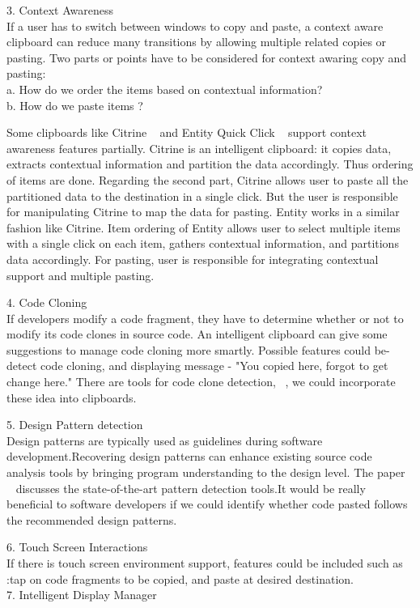 \documentclass{acm_proc_article-sp}
\begin{document}
3. Context Awareness\\
If a user has to switch between windows to copy and paste, a context aware clipboard can reduce many transitions by allowing multiple related copies or pasting. Two parts or points have to be considered for context awaring copy and pasting:\\
    a. How do we order the items based on contextual information?\\
    b. How do we paste items ?
    
    Some clipboards like Citrine ~\cite{Citrine} and Entity Quick Click ~\cite{Entity} support context awareness features partially. Citrine is an intelligent clipboard: it copies data, extracts contextual information and partition the data accordingly. Thus ordering of items are done. Regarding the second part, Citrine allows user to paste all the partitioned data to the destination in a single click. But the user is responsible for manipulating Citrine to map the data for pasting. Entity works in a similar fashion like Citrine. Item ordering of Entity allows user to select multiple items with a single click on each item, gathers contextual information, and partitions data accordingly. For pasting, user is responsible for integrating contextual support and multiple pasting.

4. Code Cloning\\
 If developers modify a code fragment, they have to determine
whether or not to modify its code clones in source code. An intelligent clipboard can  give some suggestions to manage code cloning more smartly. Possible features could be-detect code cloning, and displaying message - "You copied here, forgot to get change here." There are tools for code clone detection,  ~\cite{CloneTag}, we could incorporate these idea into clipboards.

5. Design Pattern detection\\ 
Design patterns are typically used as guidelines during
software development.Recovering design patterns can enhance existing source code analysis tools by bringing program understanding to
the design level. The paper ~\cite{Pattern} discusses the state-of-the-art pattern detection tools.It would be really beneficial to software developers if we could identify whether code pasted follows the recommended  design patterns.

6. Touch Screen Interactions\\
If there is touch screen environment support, features could be included such as :tap on code fragments to be copied, and paste at desired destination. \\
7. Intelligent Display Manager\\
~\cite{bworld}
\end{document}
